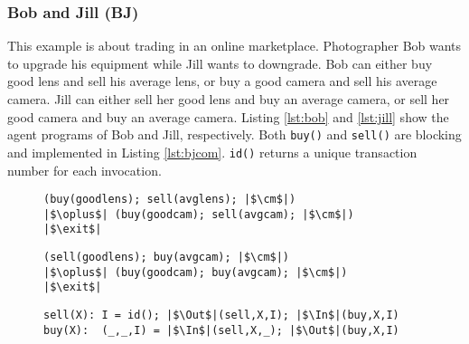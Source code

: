\subsubsection*{Bob and Jill (BJ)}

This example is about trading in an online marketplace. 
Photographer Bob wants to upgrade his equipment while Jill wants to downgrade.
Bob can either buy good lens and sell his average lens, 
or buy a good camera and sell his average camera.
Jill can either sell her good lens and buy an average camera, 
or sell her good camera and buy an average camera.
Listing \ref{lst:bob} and \ref{lst:jill} show the 
agent programs of Bob and Jill, respectively.
Both \texttt{buy()} and \texttt{sell()} are blocking and implemented in Listing \ref{lst:bjcom}.
\texttt{id()} returns a unique transaction number for each invocation.

\begin{figure}[tb]
\begin{lstlisting}[label=lst:bob,caption=Bob's Agent]
(buy(goodlens); sell(avglens); |$\cm$|)
|$\oplus$| (buy(goodcam); sell(avgcam); |$\cm$|)
|$\exit$|
\end{lstlisting}
\begin{lstlisting}[label=lst:jill,caption=Jill's Agent]
(sell(goodlens); buy(avgcam); |$\cm$|)
|$\oplus$| (buy(goodcam); buy(avgcam); |$\cm$|)
|$\exit$|
\end{lstlisting}
\begin{lstlisting}[label=lst:bjcom,caption=Common Routines for Trading]
sell(X): I = id(); |$\Out$|(sell,X,I); |$\In$|(buy,X,I)
buy(X):  (_,_,I) = |$\In$|(sell,X,_); |$\Out$|(buy,X,I)
\end{lstlisting}
\end{figure}

